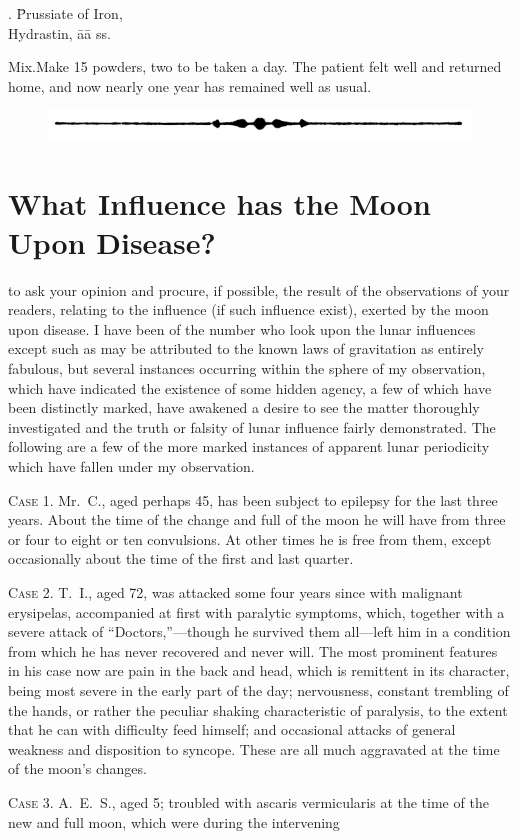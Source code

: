 
\begin{center}
\begin{tabbing}
  \prescription. \= Prussiate of Iron,  \\
    \> Hydrastin, āā \dram{} ss.
\end{tabbing}
\end{center}
Mix.\quad{}Make 15 powders, two to be taken a day. The patient felt
well and returned home, and now nearly one year has remained well as
usual.

\begin{figure}[H]
  \centering
  \includegraphics{pages/illustrations/arrow_bullet_divider.jpg}
\end{figure}

\section*{What Influence has the Moon Upon Disease?}


 to ask your opinion and procure, if possible, the result of the
observations of your readers, relating to the influence (if such influence
exist), exerted by the moon upon disease. I have been of the number
who look upon the lunar influences except such as may be attributed to
the known laws of gravitation as entirely fabulous, but several instances
occurring within the sphere of my observation, which have indicated
the existence of some hidden agency, a few of which have been distinctly
marked, have awakened a desire to see the matter thoroughly
investigated and the truth or falsity of lunar influence fairly demonstrated.
The following are a few of the more marked instances of apparent lunar
periodicity which have fallen under my observation.

\textsc{Case 1.} Mr.~C., aged perhaps 45, has been subject to epilepsy for
the last three years. About the time of the change and full of the
moon he will have from three or four to eight or ten convulsions. At
other times he is free from them, except occasionally about the time of
the first and last quarter.

\textsc{Case 2.} T.~I., aged 72, was attacked some four years since with malignant
erysipelas, accompanied at first with paralytic symptoms,
which, together with a severe attack of ``Doctors,''---though he survived
them all---left him in a condition from which he has never recovered
and never will. The most prominent features in his case now
are pain in the back and head, which is remittent in its character,
being most severe in the early part of the day; nervousness, constant
trembling of the hands, or rather the peculiar shaking characteristic of
paralysis, to the extent that he can with difficulty feed himself; and
occasional attacks of general weakness and disposition to syncope.
These  are all much aggravated at the time of the moon's
changes.

\textsc{Case 3}. A.~E.~S., aged 5; troubled with ascaris vermicularis at
the time of the new and full moon, which were during the intervening\endinput
